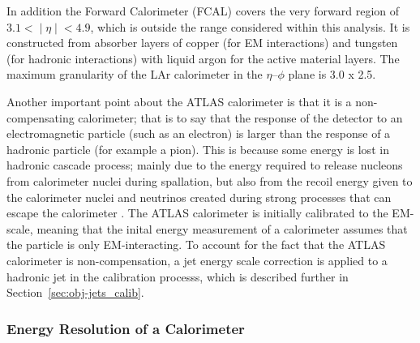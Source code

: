 In addition the Forward Calorimeter (FCAL) covers the very forward region of $3.1 < ∣\eta∣ < 4.9$,
which is outside the range considered within this analysis.
It is constructed from absorber layers of
copper (for EM interactions)
and tungsten (for hadronic interactions)
with liquid argon for the active material layers.
The maximum granularity of the LAr calorimeter in the $\eta$--$\phi$ plane is 3.0 x 2.5.



Another important point about the ATLAS calorimeter is that it is a non-compensating calorimeter;
that is to say that the response of the detector to an electromagnetic particle (such as an electron)
is larger than the response of a hadronic particle (for example a pion).
This is because some energy is lost in hadronic cascade process;
mainly due to the energy required to release nucleons from calorimeter nuclei during spallation,
but also from the recoil energy given to the calorimeter nuclei
and neutrinos created during strong processes that can escape the calorimeter \cite{det-comp_calo, det-thesis_lene}.
The ATLAS calorimeter is initially calibrated to the EM-scale,
meaning that the inital energy measurement of a calorimeter assumes that the particle is only EM-interacting.
To account for the fact that the ATLAS calorimeter is non-compensation,
a jet energy scale correction is applied to a hadronic jet in the calibration processs,
which is described further in Section~\ref{sec:obj-jets_calib}.


\subsubsection{Energy Resolution of a Calorimeter}
\label{sec:det-calo_noise}

